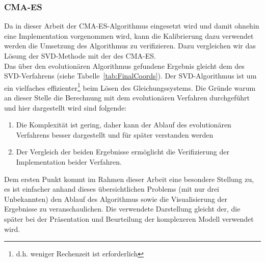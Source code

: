 \subsubsection{CMA-ES}
Da in dieser Arbeit der CMA-ES-Algorithmus eingesetzt wird und damit ohnehin eine Implementation vorgenommen wird, kann die Kalibrierung dazu verwendet werden die Umsetzung des Algorithmus zu verifizieren. Dazu vergleichen wir das Lösung der SVD-Methode mit der des CMA-ES.\\
Das über den evolutionären Algorithmus gefundene Ergebnis gleicht dem des SVD-Verfahrens (siehe Tabelle~\ref{tab:FinalCoords}). Der SVD-Algorithmus ist um ein vielfaches effizienter\footnote{d.h. weniger Rechenzeit ist erforderlich} beim Lösen des Gleichungssystems. Die Gründe warum an dieser Stelle die Berechnung mit dem evolutionären Verfahren durchgeführt und hier dargestellt wird sind folgende:
%
\begin{enumerate}
 \item Die Komplexität ist gering, daher kann der Ablauf des evolutionären Verfahrens besser dargestellt und für später verstanden werden
 \item Der Vergleich der beiden Ergebnisse ermöglicht die Verifizierung der Implementation beider Verfahren.
\end{enumerate}
%
Dem ersten Punkt kommt im Rahmen dieser Arbeit eine besondere Stellung zu, es ist einfacher anhand dieses übersichtlichen Problems (mit nur drei Unbekannten) den Ablauf des Algorithmus sowie die Visualisierung der Ergebnisse zu veranschaulichen. Die verwendete Darstellung gleicht der, die später bei der Präsentation und Beurteilung der komplexeren Modell verwendet wird.
%

%

%
